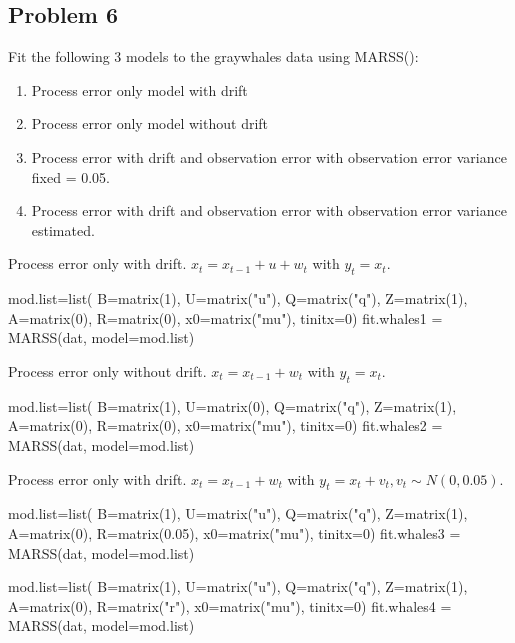 \subsection*{Problem 6}
Fit the following 3 models to the graywhales data using MARSS(): 
\begin{enumerate}
\item Process error only model with drift
\item Process error only model without drift
\item Process error with drift and observation error with observation error variance fixed = 0.05. 
\item Process error with drift and observation error with observation error variance estimated. 
\end{enumerate}
Process error only with drift. $x_t = x_{t-1} + u + w_t$ with $y_t = x_t$.
\begin{Schunk}
\begin{Sinput}
 mod.list=list(
   B=matrix(1), U=matrix("u"), Q=matrix("q"),
   Z=matrix(1), A=matrix(0), R=matrix(0),
   x0=matrix("mu"), tinitx=0)
 fit.whales1 = MARSS(dat, model=mod.list)
\end{Sinput}
\end{Schunk}
Process error only without drift. $x_t = x_{t-1} + w_t$ with $y_t = x_t$.
\begin{Schunk}
\begin{Sinput}
 mod.list=list(
   B=matrix(1), U=matrix(0), Q=matrix("q"),
   Z=matrix(1), A=matrix(0), R=matrix(0),
   x0=matrix("mu"), tinitx=0)
 fit.whales2 = MARSS(dat, model=mod.list)
\end{Sinput}
\end{Schunk}
Process error only with drift. $x_t = x_{t-1} + w_t$ with $y_t = x_t+v_t, v_t \sim N(0,0.05)$.
\begin{Schunk}
\begin{Sinput}
 mod.list=list(
   B=matrix(1), U=matrix("u"), Q=matrix("q"),
   Z=matrix(1), A=matrix(0), R=matrix(0.05),
   x0=matrix("mu"), tinitx=0)
 fit.whales3 = MARSS(dat, model=mod.list)
\end{Sinput}
\end{Schunk}
\begin{Schunk}
\begin{Sinput}
 mod.list=list(
   B=matrix(1), U=matrix("u"), Q=matrix("q"),
   Z=matrix(1), A=matrix(0), R=matrix("r"),
   x0=matrix("mu"), tinitx=0)
 fit.whales4 = MARSS(dat, model=mod.list)
\end{Sinput}
\end{Schunk}
